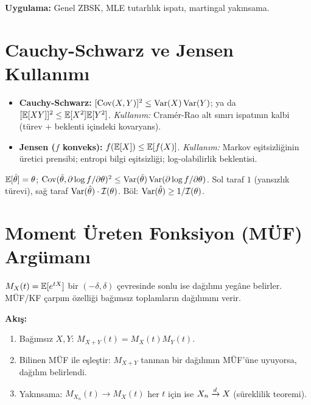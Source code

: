 \noindent\textbf{Uygulama:} Genel ZBSK, MLE tutarlılık ispatı, martingal yakınsama.

\section{Cauchy-Schwarz ve Jensen Kullanımı}
\label{app:cs_jensen}

\begin{itemize}
  \item \textbf{Cauchy-Schwarz:} $[\operatorname{Cov}(X,Y)]^2\leq\operatorname{Var}(X)\operatorname{Var}(Y)$; ya da $[\mathbb{E}[XY]]^2\leq\mathbb{E}[X^2]\mathbb{E}[Y^2]$.
    \textit{Kullanım:} Cramér-Rao alt sınırı ispatının kalbi (türev + beklenti içindeki kovaryans).
  \item \textbf{Jensen ($f$ konveks):} $f(\mathbb{E}[X])\leq\mathbb{E}[f(X)]$.
    \textit{Kullanım:} Markov eşitsizliğinin üretici prensibi; entropi bilgi eşitsizliği; log-olabilirlik beklentisi.
\end{itemize}

\begin{ornek}
$\mathbb{E}[\hat\theta]=\theta$; $\operatorname{Cov}(\hat\theta, \partial\log f/\partial\theta)^2\leq\operatorname{Var}(\hat\theta)\operatorname{Var}(\partial\log f/\partial\theta)$. Sol taraf $1$ (yansızlık türevi), sağ taraf $\operatorname{Var}(\hat\theta)\cdot\mathcal{I}(\theta)$. Böl: $\operatorname{Var}(\hat\theta)\geq1/\mathcal{I}(\theta)$.
\end{ornek}

\section{Moment Üreten Fonksiyon (MÜF) Argümanı}
\label{app:muf_arguman}

$M_X(t)=\mathbb{E}[e^{tX}]$ bir $(-\delta,\delta)$ çevresinde sonlu ise dağılımı yegâne belirler. MÜF/KF çarpım özelliği bağımsız toplamların dağılımını verir.

\noindent\textbf{Akış:}
\begin{enumerate}
  \item Bağımsız $X,Y$: $M_{X+Y}(t)=M_X(t)M_Y(t)$.
  \item Bilinen MÜF ile eşleştir: $M_{X+Y}$ tanınan bir dağılımın MÜF'üne uyuyorsa, dağılım belirlendi.
  \item Yakınsama: $M_{X_n}(t)\to M_X(t)$ her $t$ için ise $X_n\xrightarrow{d} X$ (süreklilik teoremi).
\end{enumerate}

